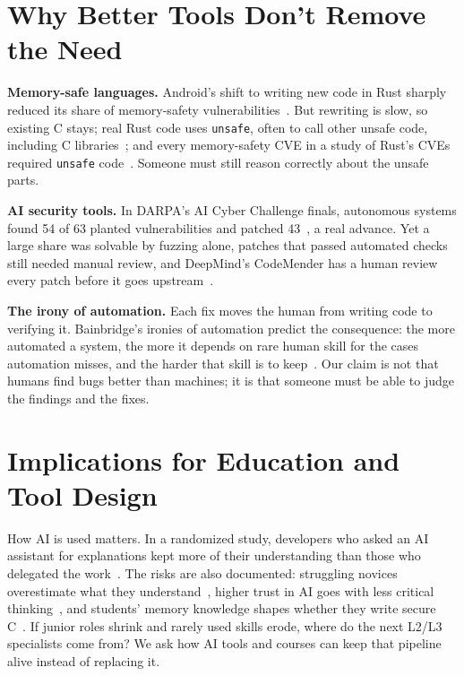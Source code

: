 \documentclass[conference]{IEEEtran}
\begin{document}
\section{Why Better Tools Don't Remove the Need}

\textbf{Memory-safe languages.} Android's shift to writing new code in Rust sharply reduced its share of memory-safety vulnerabilities~\cite{google2025rust}. But rewriting is slow, so existing C stays; real Rust code uses \texttt{unsafe}, often to call other unsafe code, including C libraries~\cite{astrauskas2020}; and every memory-safety CVE in a study of Rust's CVEs required \texttt{unsafe} code~\cite{xu2021}. Someone must still reason correctly about the unsafe parts.

\textbf{AI security tools.} In DARPA's AI Cyber Challenge finals, autonomous systems found 54 of 63 planted vulnerabilities and patched 43~\cite{darpa2025aixcc}, a real advance. Yet a large share was solvable by fuzzing alone, patches that passed automated checks still needed manual review, and DeepMind's CodeMender has a human review every patch before it goes upstream~\cite{deepmind2025codemender}.

\textbf{The irony of automation.} Each fix moves the human from writing code to verifying it. Bainbridge's ironies of automation predict the consequence: the more automated a system, the more it depends on rare human skill for the cases automation misses, and the harder that skill is to keep~\cite{bainbridge1983}. Our claim is not that humans find bugs better than machines; it is that someone must be able to judge the findings and the fixes.

\section{Implications for Education and Tool Design}

How AI is used matters. In a randomized study, developers who asked an AI assistant for explanations kept more of their understanding than those who delegated the work~\cite{shentamkin2026}. The risks are also documented: struggling novices overestimate what they understand~\cite{prather2024}, higher trust in AI goes with less critical thinking~\cite{lee2025}, and students' memory knowledge shapes whether they write secure C~\cite{almansoori2023}. If junior roles shrink and rarely used skills erode, where do the next L2/L3 specialists come from? We ask how AI tools and courses can keep that pipeline alive instead of replacing it.
\end{document}

